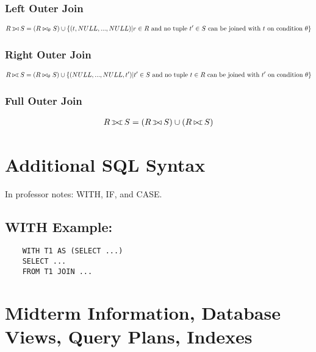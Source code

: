 \documentclass[twoside]{article}
\def\ojoin{\setbox0=\hbox{$\bowtie$}%
  \rule[-.02ex]{.25em}{.4pt}\llap{\rule[\ht0]{.25em}{.4pt}}}
\def\leftouterjoin{\mathbin{\ojoin\mkern-5.8mu\bowtie}}
\def\rightouterjoin{\mathbin{\bowtie\mkern-5.8mu\ojoin}}
\def\fullouterjoin{\mathbin{\ojoin\mkern-5.8mu\bowtie\mkern-5.8mu\ojoin}}
\begin{document}
\subsubsection*{Left Outer Join}
\begin{gather*}
    R \leftouterjoin S = (R \bowtie_{\theta} S) \cup \{(t, NULL, ..., NULL) | 
    r \in R \text{ and no tuple } t' \in S \text{ can be joined with } t \text{ 
    on condition } \theta\} 
\end{gather*}

\subsubsection*{Right Outer Join}
\begin{gather*}
    R \rightouterjoin S = (R \bowtie_{\theta} S) \cup \{(NULL, ..., NULL, t') |
    t' \in S \text{ and no tuple } t \in R \text{ can be joined with } t' \text{
    on condition } \theta\}
\end{gather*}

\subsubsection*{Full Outer Join}
\begin{gather*}
    R \fullouterjoin S = (R \leftouterjoin S) \cup (R \rightouterjoin S)
\end{gather*}

\section*{Additional SQL Syntax}
In professor notes: WITH, IF, and CASE.

\subsection*{WITH Example:}
\begin{verbatim}
    WITH T1 AS (SELECT ...)
    SELECT ...
    FROM T1 JOIN ...
\end{verbatim}

\newpage
\section{Midterm Information, Database Views, Query Plans, Indexes}
\end{document}

